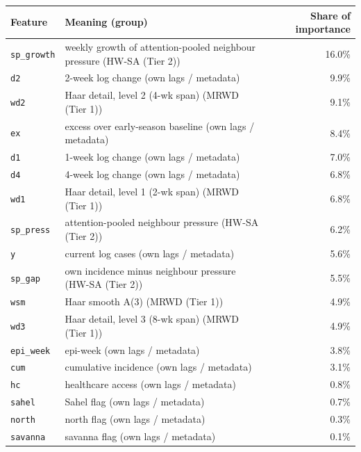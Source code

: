 \begin{tabular}{llr}
\toprule
Feature & Meaning (group) & Share of importance \\
\midrule
\texttt{sp\_growth} & weekly growth of attention-pooled neighbour pressure (HW-SA (Tier 2)) & 16.0\% \\
\texttt{d2} & 2-week log change (own lags / metadata) & 9.9\% \\
\texttt{wd2} & Haar detail, level 2 (4-wk span) (MRWD (Tier 1)) & 9.1\% \\
\texttt{ex} & excess over early-season baseline (own lags / metadata) & 8.4\% \\
\texttt{d1} & 1-week log change (own lags / metadata) & 7.0\% \\
\texttt{d4} & 4-week log change (own lags / metadata) & 6.8\% \\
\texttt{wd1} & Haar detail, level 1 (2-wk span) (MRWD (Tier 1)) & 6.8\% \\
\texttt{sp\_press} & attention-pooled neighbour pressure (HW-SA (Tier 2)) & 6.2\% \\
\texttt{y} & current log cases (own lags / metadata) & 5.6\% \\
\texttt{sp\_gap} & own incidence minus neighbour pressure (HW-SA (Tier 2)) & 5.5\% \\
\texttt{wsm} & Haar smooth A(3) (MRWD (Tier 1)) & 4.9\% \\
\texttt{wd3} & Haar detail, level 3 (8-wk span) (MRWD (Tier 1)) & 4.9\% \\
\texttt{epi\_week} & epi-week (own lags / metadata) & 3.8\% \\
\texttt{cum} & cumulative incidence (own lags / metadata) & 3.1\% \\
\texttt{hc} & healthcare access (own lags / metadata) & 0.8\% \\
\texttt{sahel} & Sahel flag (own lags / metadata) & 0.7\% \\
\texttt{north} & north flag (own lags / metadata) & 0.3\% \\
\texttt{savanna} & savanna flag (own lags / metadata) & 0.1\% \\
\bottomrule
\end{tabular}
